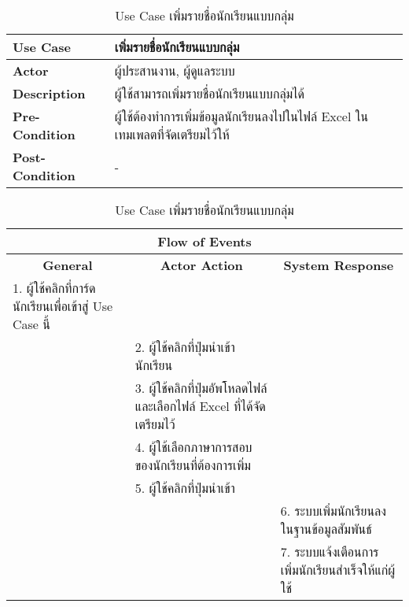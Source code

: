 \begin{table}[H]
    \caption{Use Case เพิ่มรายชื่อนักเรียนแบบกลุ่ม}
    \label{tab:use-case-create-batch-student}
    \begin{tabularx}{\textwidth}{ | p{3cm} | X | }
    \hline
    \textbf{Use Case} & เพิ่มรายชื่อนักเรียนแบบกลุ่ม \\
    \hline
    \textbf{Actor} & ผู้ประสานงาน, ผู้ดูแลระบบ \\
    \hline
    \textbf{Description} & ผู้ใช้สามารถเพิ่มรายชื่อนักเรียนแบบกลุ่มได้ \\
    \hline
    \textbf{Pre-Condition} & ผู้ใช้ต้องทำการเพิ่มข้อมูลนักเรียนลงไปในไฟล์ Excel ในเทมเพลตที่จัดเตรียมไว้ให้ \\
    \hline
    \textbf{Post-Condition} & - \\
    \hline
    \end{tabularx}
    \begin{tabularx}{\textwidth}{ | X | X | X | }
    \multicolumn{3}{|c|}{\textbf{Flow of Events}} \\
    \hline
    \multicolumn{1}{|c|}{\textbf{General}} & \multicolumn{1}{|c|}{\textbf{Actor Action}} & \multicolumn{1}{|c|}{\textbf{System Response}} \\
    \hline
    1. ผู้ใช้คลิกที่การ์ดนักเรียนเพื่อเข้าสู่ Use Case นี้ & & \\
    \hline
    & 2. ผู้ใช้คลิกที่ปุ่มนำเข้านักเรียน & \\
    \hline
    & 3. ผู้ใช้คลิกที่ปุ่มอัพโหลดไฟล์ และเลือกไฟล์ Excel ที่ได้จัดเตรียมไว้ & \\
    \hline
    & 4. ผู้ใช้เลือกภาษาการสอบของนักเรียนที่ต้องการเพิ่ม & \\
    \hline
    & 5. ผู้ใช้คลิกที่ปุ่มนำเข้า & \\
    \hline
    & & 6. ระบบเพิ่มนักเรียนลงในฐานข้อมูลสัมพันธ์ \\
    \hline
    & & 7. ระบบแจ้งเตือนการเพิ่มนักเรียนสำเร็จให้แก่ผู้ใช้ \\
    \hline
    \end{tabularx}
\end{table}
